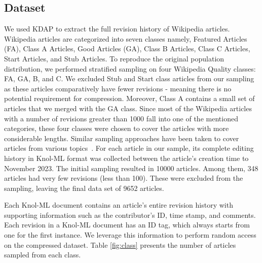 \documentclass[acmsmall]{acmart}
\begin{document}
\subsection{Dataset}
We used KDAP to extract the full revision history of Wikipedia articles. Wikipedia articles are categorized into seven classes namely, Featured Articles (FA), Class A Articles, Good Articles (GA), Class B Articles, Class C Articles, Start Articles, and Stub Articles. To reproduce the original population distribution, we performed stratified sampling on four Wikipedia Quality classes: FA, GA, B, and C. We excluded Stub and Start class articles from our sampling as these articles comparatively have fewer revisions - meaning there is no potential requirement for compression. Moreover, Class A contains a small set of articles that we merged with the GA class. Since most of the Wikipedia articles with a number of revisions greater than 1000 fall into one of the mentioned categories, these four classes were chosen to cover the articles with more considerable lengths. Similar sampling approaches have been taken to cover articles from various topics~\cite{arazy2011information}. For each article in our sample, its complete editing history in Knol-ML format was collected between the article's creation time to November 2023. The initial sampling resulted in 10000 articles. Among them, 348 articles had very few revisions (less than 100). These were excluded from the sampling, leaving the final data set of 9652 articles.

Each Knol-ML document contains an article's entire revision history with supporting information such as the contributor's ID, time stamp, and comments. Each revision in a Knol-ML document has an ID tag, which always starts from one for the first instance. We leverage this information to perform random access on the compressed dataset. Table \ref{fig:class} presents the number of articles sampled from each class.
\end{document}
